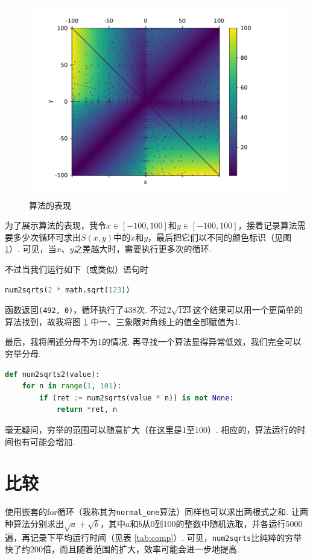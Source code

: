 \documentclass[a4paper, UTF8]{ctexart}
\begin{document}
\begin{figure}[tb]
    \centering
    \includegraphics[width=0.8\linewidth]{perform.pdf}
    \caption{算法的表现}
    \label{fig:perform1}
\end{figure}

为了展示算法的表现，我令$x\in[-100,100]$和$y\in[-100,100]$，接着记录算法需要多少次循环可求出$S(x,y)$中的$x$和$y$，最后把它们以不同的颜色标识（见图 \ref{fig:perform1}）. 可见，当$x$、$y$之差越大时，需要执行更多次的循环.

不过当我们运行如下（或类似）语句时
\begin{lstlisting}[language=python]
num2sqrts(2 * math.sqrt(123))
\end{lstlisting}
函数返回\verb|(492, 0)|，循环执行了438次. 不过$2\sqrt{123}$这个结果可以用一个更简单的算法找到，故我将图 \ref{fig:perform1} 中一、三象限对角线上的值全部赋值为1.

最后，我将阐述分母不为1的情况. 再寻找一个算法显得异常低效，我们完全可以穷举分母.
\begin{lstlisting}[language=python, name=example2]
def num2sqrts2(value):
    for n in range(1, 101):
        if (ret := num2sqrts(value * n)) is not None:
            return *ret, n
\end{lstlisting}
毫无疑问，穷举的范围可以随意扩大（在这里是1至100）. 相应的，算法运行的时间也有可能会增加.

\section{比较}
使用嵌套的for循环（我称其为\verb|normal_one|算法）同样也可以求出两根式之和. 让两种算法分别求出$\sqrt{a}+\sqrt{b}$，其中$a$和$b$从0到100的整数中随机选取，并各运行5000遍，再记录下平均运行时间（见表 \ref{tab:comp}）. 可见，\verb|num2sqrts|比纯粹的穷举快了约200倍，而且随着范围的扩大，效率可能会进一步地提高.
\end{document}
